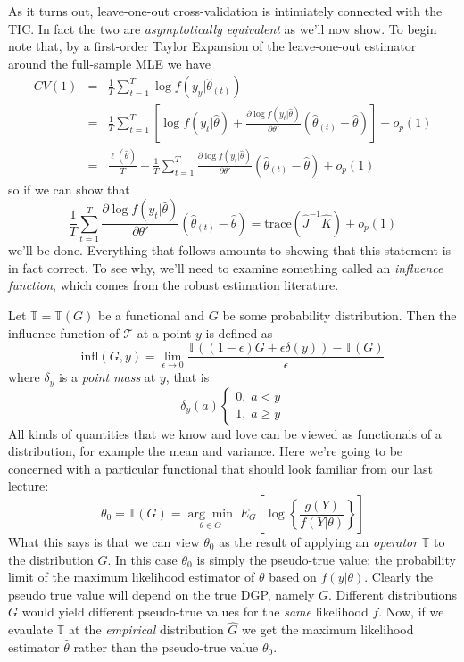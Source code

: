 \documentclass[12pt]{article}
\theoremstyle{definition}
\begin{document}
As it turns out, leave-one-out cross-validation is intimiately connected with the TIC. In fact the two are \emph{asymptotically equivalent} as we'll now show. To begin note that, by a first-order Taylor Expansion of the leave-one-out estimator around the full-sample MLE we have
	\begin{eqnarray*}
		CV(1) &=& \frac{1}{T} \sum_{t=1}^T \log f(y_y|\widehat{\theta}_{(t)})\\
			&=&\frac{1}{T} \sum_{t=1}^T \left[\log f(y_t|\widehat{\theta}) + \frac{\partial \log f(y_t|\widehat{\theta})}{\partial \theta'}\left(\widehat{\theta}_{(t)} - \widehat{\theta} \right) \right] + o_p(1)\\
			&=& \frac{\ell(\widehat{\theta})}{T} + \frac{1}{T}\sum_{t=1}^T \frac{\partial \log f(y_t|\widehat{\theta})}{\partial \theta'}\left(\widehat{\theta}_{(t)} - \widehat{\theta} \right) + o_p(1)
	\end{eqnarray*}
so if we can show that 
	$$\frac{1}{T}\sum_{t=1}^T \frac{\partial \log f(y_t|\widehat{\theta})}{\partial \theta'}\left(\widehat{\theta}_{(t)} - \widehat{\theta} \right) = \mbox{trace}\left(\widehat{J}^{-1} \widehat{K} \right) + o_p(1)$$
we'll be done. Everything that follows amounts to showing that this statement is in fact correct. To see why, we'll need to examine something called an \emph{influence function}, which comes from the robust estimation literature.

Let $\mathbb{T}=\mathbb{T}(G)$ be a functional and $G$ be some probability distribution. Then the influence function of $\mathcal{T}$ at a point $y$ is defined as 
	$$\mbox{infl}(G,y) = \lim_{\epsilon \rightarrow 0} \frac{\mathbb{T}\left(\left(1-\epsilon\right)G + \epsilon \delta\left(y\right)\right) - \mathbb{T}(G)}{\epsilon}$$
where $\delta_y$ is a \emph{point mass} at $y$, that is
		$$\delta_y(a)\left\{\begin{array}{c} 0, \; a<y \\ 1, \; a\geq y\end{array} \right.$$
 All kinds of quantities that we know and love can be viewed as functionals of a distribution, for example the mean and variance. Here we're going to be concerned with a particular functional that should look familiar from our last lecture:
	$$\theta_0 = \mathbb{T}(G) = \underset{\theta \in \Theta}{\arg \min} \;E_G\left[\log\left\{\frac{g(Y)}{f(Y|\theta)} \right\} \right]$$
What this says is that we can view $\theta_0$ as the result of applying an \emph{operator} $\mathbb{T}$ to the distribution $G$. In this case $\theta_0$ is simply the pseudo-true value: the probability limit of the maximum likelihood estimator of $\theta$ based on $f(y|\theta)$. Clearly the pseudo true value will depend on the true DGP, namely $G$. Different distributions $G$ would yield different pseudo-true values for the \emph{same} likelihood $f$. Now, if we evaulate $\mathbb{T}$ at the \emph{empirical} distribution $\widehat{G}$ we get the maximum likelihood estimator $\widehat{\theta}$ rather than the pseudo-true value $\theta_0$.
\end{document}
